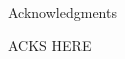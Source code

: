 
\renewcommand{\baselinestretch}{2}
\small\normalsize
\hbox{\ }
 
\vspace{.5in}

\begin{center}
\large{Acknowledgments} 
\end{center} 

\vspace{1ex}

ACKS HERE
